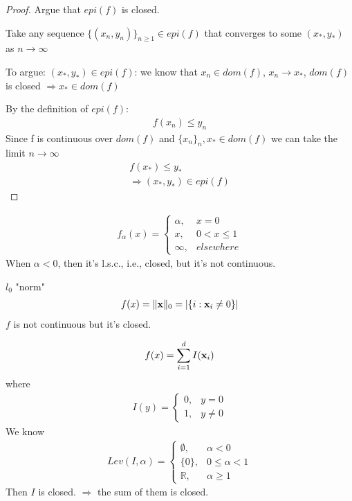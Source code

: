 \documentclass[11pt]{article}
\begin{document}
\begin{proof}
    Argue that $epi(f)$ is closed.

    Take any sequence  $\{ (x_n,y_n) \}_{n\ge 1} \in epi(f)$ that converges to some $(x_{*}, y_{*})$ as $n \longrightarrow \infty$

    To argue: $(x_{*}, y_{*}) \in epi(f)$: we know that $x_n \in dom(f)$, $x_n \longrightarrow x_{*}$,
    $dom(f)$ is closed $\Longrightarrow x_{*} \in dom(f)$

    By the definition of $epi(f)$:
    \begin{align*}
        f(x_n) \le y_n
    \end{align*}
    Since f is continuous over $dom(f)$ and $\{ x_n \}_{n}, x_{*} \in dom(f)$ we can take the limit $n \longrightarrow \infty$
    \begin{align*}
        f(x_{*}) \le y_{*}\\
        \Longrightarrow (x_{*},y_{*}) \in epi(f)
    \end{align*}
\end{proof}

\begin{example}
 \item 
 \begin{align}
    f_{\alpha}(x) = \begin{cases} 
    \alpha, &  x=0\\ 
    x, &   0 < x \le 1\\
    \infty, & elsewhere
    \end{cases}
 \end{align}
 When $\alpha < 0$, then it's l.s.c., i.e., closed, but it's not continuous.
 \item $l_{0}$ "norm"
 \begin{align*}
    f(x) = \| {\mathbf{x}} \| _{0} = |\{ i:{\mathbf{x}}_{i} \neq 0 \}| 
 \end{align*}
 $f$ is not continuous but it's closed.

 \begin{align*}
    f(x) = \sum_{i=1}^{d}I({\mathbf{x}}_{i})
 \end{align*}
 where 
 \begin{align*}
    I(y) = \begin{cases} 
    0, & y=0 \\ 
    1, & y\neq 0  
    \end{cases}
 \end{align*}
 We know 
 \begin{align*}
    Lev(I,\alpha) = \begin{cases} 
    \emptyset , &  \alpha < 0\\ 
    \{ 0 \}, &   0 \le \alpha < 1\\
    \mathbb{R}, & \alpha \ge 1
    \end{cases}
 \end{align*}
 Then $I$ is closed. $\Longrightarrow$ the sum of them is closed.
\end{example}
\end{document}

